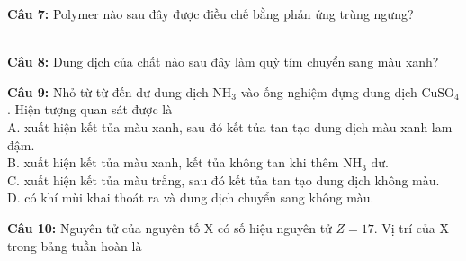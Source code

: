 \documentclass[12pt,a4paper]{article}
\begin{document}
\par\noindent\begin{minipage}{\linewidth}
\noindent \textbf{Câu 7:} Polymer nào sau đây được điều chế bằng phản ứng trùng ngưng?\\
\noindent{}\\
\noindent{}
\end{minipage}\par\vspace{0.12cm}

\par\noindent\begin{minipage}{\linewidth}
\noindent \textbf{Câu 8:} Dung dịch của chất nào sau đây làm quỳ tím chuyển sang màu xanh?\\
\noindent{}
\end{minipage}\par\vspace{0.12cm}

\par\noindent\begin{minipage}{\linewidth}
\noindent \textbf{Câu 9:} Nhỏ từ từ đến dư dung dịch $\text{NH}_3$ vào ống nghiệm đựng dung dịch $\text{CuSO}_4$. Hiện tượng quan sát được là\\
\noindent A. xuất hiện kết tủa màu xanh, sau đó kết tủa tan tạo dung dịch màu xanh lam đậm.\\
\noindent B. xuất hiện kết tủa màu xanh, kết tủa không tan khi thêm $\text{NH}_3$ dư.\\
\noindent C. xuất hiện kết tủa màu trắng, sau đó kết tủa tan tạo dung dịch không màu.\\
\noindent D. có khí mùi khai thoát ra và dung dịch chuyển sang không màu.
\end{minipage}\par\vspace{0.12cm}

\par\noindent\begin{minipage}{\linewidth}
\noindent \textbf{Câu 10:} Nguyên tử của nguyên tố X có số hiệu nguyên tử $Z = 17$. Vị trí của X trong bảng tuần hoàn là\\
\noindent{}\\
\noindent{}
\end{minipage}\par\vspace{0.12cm}
\end{document}

